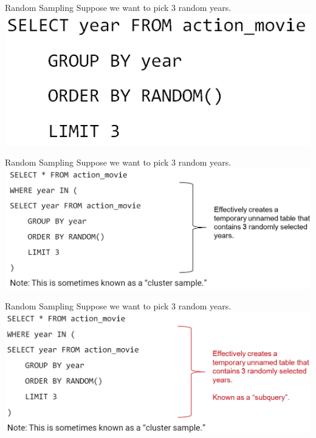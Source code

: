 \documentclass[aspectratio=169]{../latex_main/tntbeamer}  %
\begin{document}
	
	\begin{frame}{Random Sampling}
	    Suppose we want to pick 3 random years.\\
	    \includegraphics[scale=.5]{Bild32}
	\end{frame}
	
	
	\begin{frame}{Random Sampling}
	    Suppose we want to pick 3 random years.\\
	    \includegraphics[scale=.45]{Bild33}
	\end{frame}
	
	
	
	\begin{frame}{Random Sampling}
	    Suppose we want to pick 3 random years.\\

	    \includegraphics[scale=.45]{Bild34}
	\end{frame}
	
\end{document}
